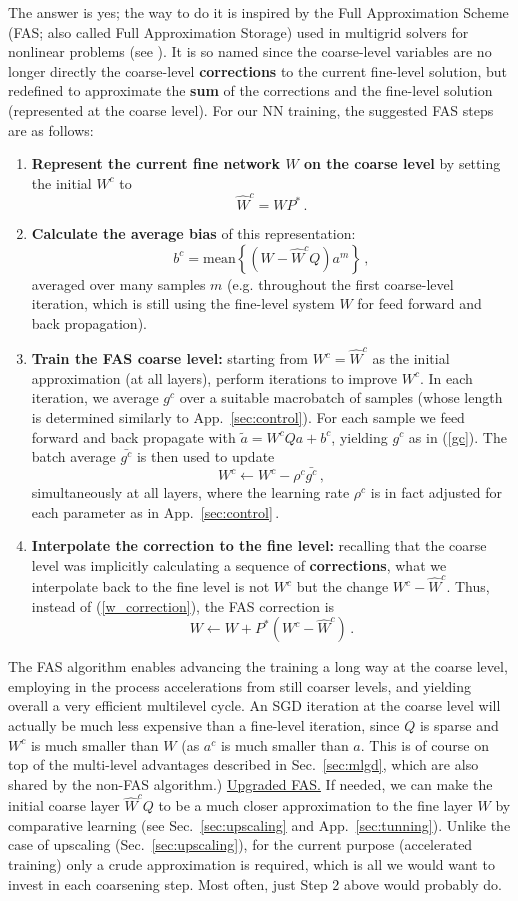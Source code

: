\documentclass{article} %
\begin{document}
The answer is yes; the way to do it is inspired by the Full Approximation Scheme (FAS; also called Full Approximation Storage) used in multigrid solvers for nonlinear problems (see \cite{guide}). It is so named since the coarse-level variables are no longer directly the coarse-level \textbf{corrections} to the current fine-level solution, but redefined to approximate the \textbf{sum} of the corrections and the fine-level solution (represented at the coarse level). For our NN training, the suggested FAS steps are as follows:
\begin{enumerate}
	\item \textbf{Represent the current fine network $W$ on the coarse level} by setting the initial $W^c$ to
	$$ \hat{W}^c = W P^*\,. $$
	\item \textbf{Calculate the average bias} of this representation:
	$$ b^c = {\mbox{mean}}\left\{ \left( W - \hat{W}^c Q \right) a^m \right\}\,, $$
averaged over many samples $m$ (e.g. throughout the first coarse-level iteration, which is still using the fine-level system $W$ for feed forward and back propagation).
	\item \textbf{Train the FAS coarse level:} starting from $W^c = \hat{W}^c$ as the initial approximation (at all layers), perform iterations to improve $W^c$. In each iteration, we average $g^c$ over a suitable macrobatch of samples (whose length is determined similarly to App.~\ref{sec:control}). For each sample we feed forward and back propagate with $\tilde{a} = W^c Q a + b^c$, yielding $g^c$ as in (\ref{gc}). The batch average $\bar{g^c}$ is then used to update
	$$ W^c \longleftarrow W^c - \rho^c \bar{g^c}\,, $$
	simultaneously at all layers, where the learning rate $\rho^c$ is in fact adjusted for each parameter as in App.~\ref{sec:control}\,.
	\item \textbf{Interpolate the correction to the fine level:} recalling that the coarse level was implicitly calculating a sequence of \textbf{corrections}, what we interpolate back to the fine level is not $W^c$ but the change $W^c - \hat{W}^c$. Thus, instead of (\ref{w_correction}), the FAS correction is
	$$ W \longleftarrow W + P^* \left( W^c - \hat{W}^c \right)\,. $$
\end{enumerate}

The FAS algorithm enables advancing the training a long way at the coarse level, employing in the process accelerations from still coarser levels, and yielding overall a very efficient multilevel cycle. An SGD iteration at the coarse level will actually be much less expensive than a fine-level iteration, since $Q$ is sparse and $W^c$ is much smaller than $W$ (as $a^c$ is much smaller than $a$. This is of course on top of the multi-level advantages described in Sec.~\ref{sec:mlgd}, which are also shared by the non-FAS algorithm.)
\underline{Upgraded FAS.} If needed, we can make the initial coarse layer $\hat{W}^c Q$ to be a much closer approximation to the fine layer $W$ by comparative learning (see Sec.~\ref{sec:upscaling} and App.~\ref{sec:tunning}). Unlike the case of upscaling (Sec.~\ref{sec:upscaling}), for the current purpose (accelerated training) only a crude approximation is required, which is all we would want to invest in each coarsening step. Most often, just Step 2 above would probably do.
\end{document}
